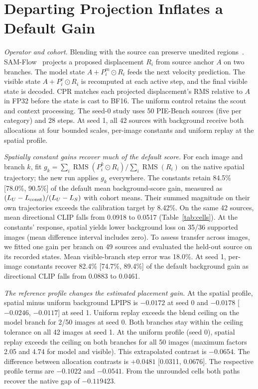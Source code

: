 \documentclass[10pt,doubleanonymous]{ieeeconf}
\newcommand{\RMS}{\operatorname{RMS}}
\begin{document}
\section{Departing Projection Inflates a Default Gain}\label{sec:depart}
\noindent\textit{Operator and cohort.} Blending with the source can preserve unedited regions~\cite{avrahami2023blendedlatent}. SAM-Flow~\cite{cui2026sam} projects a proposed displacement $R_i$ from source anchor $A$ on two branches. The model state $A+P_i^m\odot R_i$ feeds the next velocity prediction. The visible state $A+P_i^v\odot R_i$ is recomputed at each active step, and the final visible state is decoded. CPR matches each projected displacement's RMS relative to $A$ in FP32 before the state is cast to BF16. The uniform control retains the scout and context processing. The seed-0 study uses 50 PIE-Bench sources (five per category) and 28 steps. At seed 1, all 42 sources with background receive both allocations at four bounded scales, per-image constants and uniform replay at the spatial profile.

\noindent\textit{Spatially constant gains recover much of the default score.} For each image and branch $k$, fit $g_k=\sum_i\RMS(P_i^k\odot R_i)/\sum_i\RMS(R_i)$ on the native spatial trajectory; the new run applies $g_k$ everywhere. The constants retain 84.5\% [78.0\%, 90.5\%] of the default mean background-score gain, measured as $(L_U-L_{\rm const})/(L_U-L_S)$ with cohort means. Their summed magnitude on their own trajectories exceeds the calibration target by 8.42\%. On the same 42 sources, mean directional CLIP falls from 0.0918 to 0.0517 (Table~\ref{tab:cells}). At the constants' response, spatial yields lower background loss on 35/36 supported images (mean difference interval includes zero). To assess transfer across images, we fitted one gain per branch on 49 sources and evaluated the held-out source on its recorded states. Mean visible-branch step error was 18.0\%. At seed 1, per-image constants recover 82.4\% [74.7\%, 89.4\%] of the default background gain as directional CLIP falls from 0.0883 to 0.0461.

\noindent\textit{The reference profile changes the estimated placement gain.} At the spatial profile, spatial minus uniform background LPIPS is $-0.0172$ at seed 0 and $-0.0178$ [$-0.0246$, $-0.0117$] at seed 1. Uniform replay exceeds the blend ceiling on the model branch for 2/50 images at seed 0. Both branches stay within the ceiling tolerance on all 42 images at seed 1. At the uniform profile (seed 0), spatial replay exceeds the ceiling on both branches for all 50 images (maximum factors 2.05 and 4.74 for model and visible). This extrapolated contrast is $-0.0654$. The difference between allocation contrasts is $+0.0481$ [0.0311, 0.0676]. The respective profile terms are $-0.1022$ and $-0.0541$. From the unrounded cells both paths recover the native gap of $-0.119423$.
\end{document}
